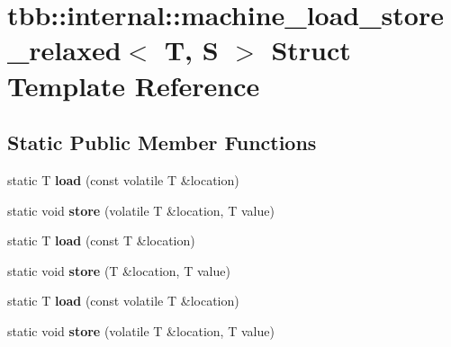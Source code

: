 \hypertarget{structtbb_1_1internal_1_1machine__load__store__relaxed}{}\section{tbb\+:\+:internal\+:\+:machine\+\_\+load\+\_\+store\+\_\+relaxed$<$ T, S $>$ Struct Template Reference}
\label{structtbb_1_1internal_1_1machine__load__store__relaxed}
\subsection*{Static Public Member Functions}
\begin{DoxyCompactItemize}
\item 
\hypertarget{structtbb_1_1internal_1_1machine__load__store__relaxed_a1b80a3a92a2a04ddd33334a5bba5ff59}{}static T {\bfseries load} (const volatile T \&location)\label{structtbb_1_1internal_1_1machine__load__store__relaxed_a1b80a3a92a2a04ddd33334a5bba5ff59}

\item 
\hypertarget{structtbb_1_1internal_1_1machine__load__store__relaxed_a03317c08162a86a5464870dbb608e2ff}{}static void {\bfseries store} (volatile T \&location, T value)\label{structtbb_1_1internal_1_1machine__load__store__relaxed_a03317c08162a86a5464870dbb608e2ff}

\item 
\hypertarget{structtbb_1_1internal_1_1machine__load__store__relaxed_abb01d548d9222efef16b42f7214c93af}{}static T {\bfseries load} (const T \&location)\label{structtbb_1_1internal_1_1machine__load__store__relaxed_abb01d548d9222efef16b42f7214c93af}

\item 
\hypertarget{structtbb_1_1internal_1_1machine__load__store__relaxed_a4697b251b75f202000aee4dfcdb047da}{}static void {\bfseries store} (T \&location, T value)\label{structtbb_1_1internal_1_1machine__load__store__relaxed_a4697b251b75f202000aee4dfcdb047da}

\item 
\hypertarget{structtbb_1_1internal_1_1machine__load__store__relaxed_a1b80a3a92a2a04ddd33334a5bba5ff59}{}static T {\bfseries load} (const volatile T \&location)\label{structtbb_1_1internal_1_1machine__load__store__relaxed_a1b80a3a92a2a04ddd33334a5bba5ff59}

\item 
\hypertarget{structtbb_1_1internal_1_1machine__load__store__relaxed_a03317c08162a86a5464870dbb608e2ff}{}static void {\bfseries store} (volatile T \&location, T value)\label{structtbb_1_1internal_1_1machine__load__store__relaxed_a03317c08162a86a5464870dbb608e2ff}

\end{DoxyCompactItemize}


